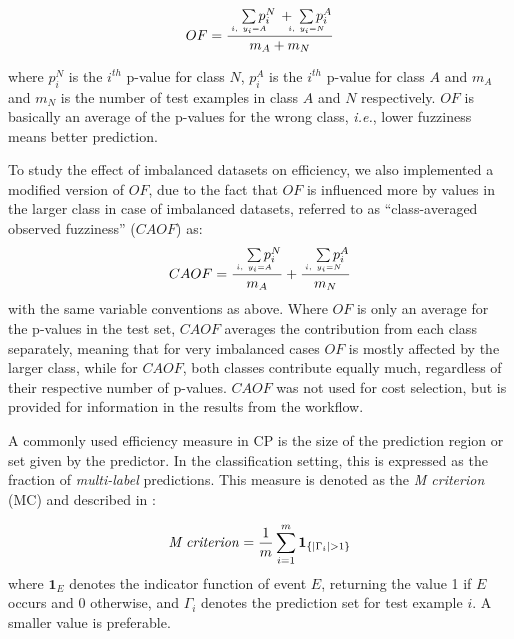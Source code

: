 \documentclass[utf8]{frontiersSCNS} %
\begin{document}
\begin{equation}
OF =  \frac
        {\quad\sum\limits_{\mathclap{\substack{\scriptscriptstyle i,\ y_i=A}}}p_i^N \, + \;\sum\limits_{\mathclap{\substack{\scriptscriptstyle i,\ y_i=N}}}p_i^A}
        {m_A + m_N}
\end{equation}

where $p_i^N$ is the $i^{th}$ p-value for class $N$, $p_i^A$ is the $i^{th}$
p-value for class $A$ and $m_A$ and $m_N$ is the number of test examples in
class $A$ and $N$ respectively. $OF$ is basically an average of the p-values for
the wrong class, \textit{i.e.}, lower fuzziness means better prediction.

To study the effect of imbalanced datasets on efficiency, we also implemented a
modified version of $OF$, due to the fact that $OF$ is influenced more
by values in the larger class in case of imbalanced datasets, referred to as
``class-averaged
observed fuzziness'' ($CAOF$) as:
\begin{equation}
CAOF = \frac
        {\quad\sum\limits_{\mathclap{\substack{\scriptscriptstyle i,\ y_i=A}}}p_i^N}
        {m_A}
       + \frac
        {\quad\sum\limits_{\mathclap{\substack{\scriptscriptstyle i,\ y_i=N}}}p_i^A}
        {m_N}
\end{equation}
with the same variable conventions as above. Where $OF$ is only an average for
the p-values in the test set, $CAOF$ averages the contribution from each class
separately, meaning that for very imbalanced cases $OF$ is mostly affected by
the larger class, while for $CAOF$, both classes contribute equally much,
regardless of their respective number of p-values.
%
%
%
$CAOF$ was not used for cost selection, but is provided for information in the
results from the workflow.

A commonly used efficiency measure in CP is the size of the prediction region or set 
given by the predictor. In the classification setting, this is expressed as the fraction of
\textit{multi-label} predictions. This measure is denoted as the \textit{M criterion} (MC) and described
in \cite{Vovk2016}:

\begin{equation}
\text{\textit{M criterion}} = \frac{ 1}{m} \sum\limits_{i=1}^{m}  \boldsymbol{1}_{\{|\Gamma_i|>1\}}	
\end{equation}
where $\boldsymbol{1}_E$ denotes the indicator function of event $E$, returning the 
value 1 if $E$ occurs and 0 otherwise, and $\Gamma_i$ denotes the prediction set 
for test example $i$.  A smaller value is preferable. 
\end{document}
